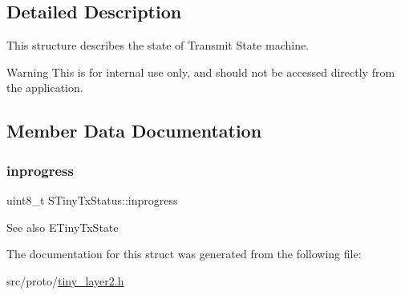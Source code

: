 \subsection{Detailed Description}
This structure describes the state of Transmit State machine. \begin{DoxyWarning}{Warning}
This is for internal use only, and should not be accessed directly from the application. 
\end{DoxyWarning}


\subsection{Member Data Documentation}
\mbox{\label{structSTinyTxStatus_a8d7fa9861ba2adb1fd4ad4689548d238}} 
\subsubsection{\texorpdfstring{inprogress}{inprogress}}
{\footnotesize\ttfamily uint8\+\_\+t S\+Tiny\+Tx\+Status\+::inprogress}

\begin{DoxySeeAlso}{See also}
E\+Tiny\+Tx\+State 
\end{DoxySeeAlso}


The documentation for this struct was generated from the following file\+:\begin{DoxyCompactItemize}
\item 
src/proto/\hyperlink{tiny__layer2_8h}{tiny\+\_\+layer2.\+h}\end{DoxyCompactItemize}
